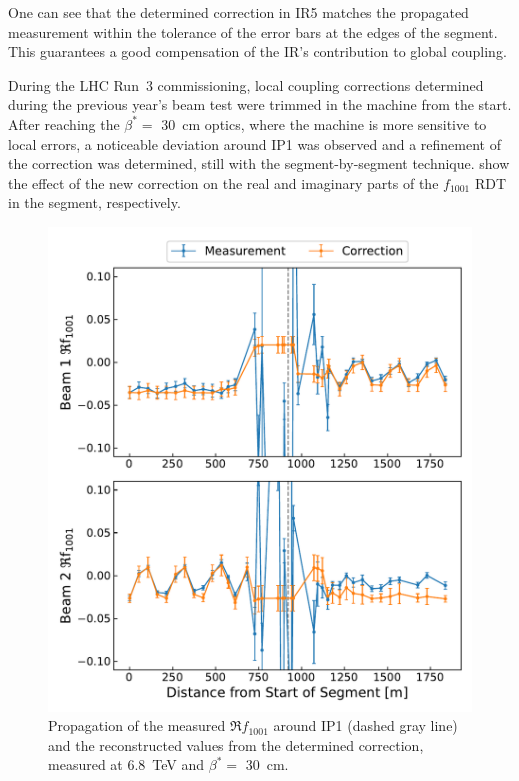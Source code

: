 One can see that the determined correction in IR\num{5} matches the propagated measurement within the tolerance of the error bars at the edges of the segment.
This guarantees a good compensation of the IR's contribution to global coupling.

During the LHC Run~\num{3} commissioning, local coupling corrections determined during the previous year's beam test were trimmed in the machine from the start.
After reaching the \(\beta^{*}=\) \qty{30}{\centi\meter} optics, where the machine is more sensitive to local errors, a noticeable deviation around IP\num{1} was observed and a refinement of the correction was determined, still with the segment-by-segment technique.
 show the effect of the new correction on the real and imaginary parts of the \(f_{1001}\) RDT in the segment, respectively.

\begin{figure}[!htb]
    \centering
    \includegraphics*[width=\textwidth]{Figures/IR_Coupling_Correction/commissioning_sbs_real_f1001_ip1.pdf}
    \caption{Propagation of the measured \(\Re f_{1001}\) around IP\num{1} (dashed gray line) and the reconstructed values from the determined correction, measured at \qty{6.8}{\tera\electronvolt} and \(\beta^{*}=\) \qty{30}{\centi\meter}.}
    \label{figure:commissioning_sbs_real_f1001_ip1}
\end{figure}
  
